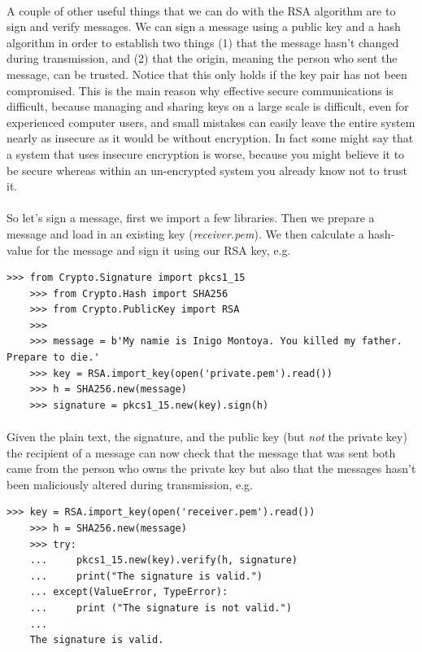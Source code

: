 \documentclass[12pt, a4paper, oneside]{book}
\begin{document}
{\paragraph{} A couple of other useful things that we can do with the RSA algorithm are to sign and verify messages. We can sign a message using a public key and a hash algorithm in order to establish two things (1) that the message hasn't changed during transmission, and (2) that the origin, meaning the person who sent the message, can be trusted. Notice that this only holds if the key pair has not been compromised. This is the main reason why effective secure communications is difficult, because managing and sharing keys on a large scale is difficult, even for experienced computer users, and small mistakes can easily leave the entire system nearly as insecure as it would be without encryption. In fact some might say that a system that uses insecure encryption is worse, because you might believe it to be secure whereas within an un-encrypted system you already know not to trust it.

\paragraph{} So let's sign a message, first we import a few libraries. Then we prepare a message and load in an existing key (\emph{receiver.pem}). We then calculate a hash-value for the message and sign it using our RSA key, e.g.

\begin{lstlisting}[style=DOS]
    >>> from Crypto.Signature import pkcs1_15
    >>> from Crypto.Hash import SHA256
    >>> from Crypto.PublicKey import RSA
    >>>
    >>> message = b'My namie is Inigo Montoya. You killed my father. Prepare to die.'
    >>> key = RSA.import_key(open('private.pem').read())
    >>> h = SHA256.new(message)
    >>> signature = pkcs1_15.new(key).sign(h)
\end{lstlisting}

\paragraph{} Given the plain text, the signature, and the public key (but \emph{not} the private key) the recipient of a message can now check that the message that was sent both came from the person who owns the private key but also that the messages hasn't been maliciously altered during transmission, e.g.

\begin{lstlisting}[style=DOS]
    >>> key = RSA.import_key(open('receiver.pem').read())
    >>> h = SHA256.new(message)
    >>> try:
    ...     pkcs1_15.new(key).verify(h, signature)
    ...     print("The signature is valid.")
    ... except(ValueError, TypeError):
    ...     print ("The signature is not valid.")
    ... 
    The signature is valid.
\end{lstlisting}

}
\end{document}
